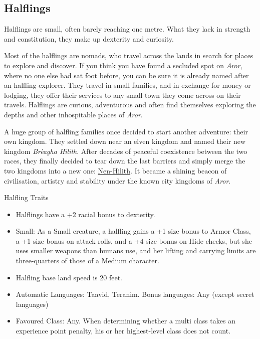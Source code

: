 \subsection{Halflings}
\label{sec:Halflings}

Halflings are small, often barely reaching one metre. What they lack in
strength and constitution, they make up dexterity and curiosity.

Most of the halflings are nomads, who travel across the lands in search for
places to explore and discover. If you think you have found a secluded spot on
\emph{Aror}, where no one else had sat foot before, you can be sure it is
already named after an halfling explorer. They travel in small families, and
in exchange for money or lodging, they offer their services to any small town
they come across on their travels. Halflings are curious, adventurous and
often find themselves exploring the depths and other inhospitable places of
\emph{Aror}.

A huge group of halfling families once decided to start another adventure:
their own kingdom. They settled down near an elven kingdom and named their new
kingdom \emph{Brèagha Hilith}. After decades of peaceful coexistence between
the two races, they finally decided to tear down the last barriers and simply
merge the two kingdoms into a new one: \hyperref[sec:Nen-Hilith]{Nen-Hilith}. It
became a shining beacon of civilisation, artistry and stability under the
known city kingdoms of \emph{Aror}.


\begin{35e}{Halfling Traits}
  \begin{itemize}[noitemsep]
    \item Halflings have a +2 racial bonus to dexterity.
    \item Small: As a Small creature, a halfling gains a +1 size bonus to
    Armor Class, a +1 size bonus on attack rolls, and a +4 size bonus on Hide
    checks, but she uses smaller weapons than humans use, and her lifting and
    carrying limits are three-quarters of those of a Medium character.
    \item Halfling base land speed is 20 feet.
    \item Automatic Languages: Taavid, Teranim. Bonus languages: Any
    (except secret languages)
    \item Favoured Class: Any. When determining whether a multi class takes an
          experience point penalty, his or her highest-level class does not
          count.
  \end{itemize}
\end{35e}
